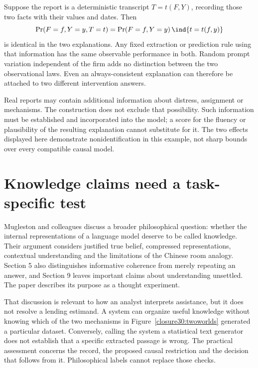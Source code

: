 Suppose the report is a deterministic transcript $T=t(F,Y)$, recording those
two facts with their values and dates. Then
\begin{equation}
 \Pr(F=f,Y=y,T=t)=\Pr(F=f,Y=y)\,\ind\{t=t(f,y)\}
\end{equation}
is identical in the two explanations. Any fixed extraction or prediction rule
using that information has the same observable performance in both. Random
prompt variation independent of the firm adds no distinction between the two
observational laws. Even an always-consistent explanation can therefore be
attached to two different intervention answers.

Real reports may contain additional information about distress, assignment
or mechanisms. The construction does not exclude that possibility. Such
information must be established and incorporated into the model; a score for
the fluency or plausibility of the resulting explanation cannot substitute
for it. The two effects displayed here demonstrate nonidentification in this
example, not sharp bounds over every compatible causal model.

\section{Knowledge claims need a task-specific test}

Mugleston and colleagues discuss a broader philosophical question: whether
the internal representations of a language model deserve to be called
knowledge. Their argument considers justified true belief, compressed
representations, contextual understanding and the limitations of the Chinese
room analogy. Section 5 also distinguishes informative coherence from merely
repeating an answer, and Section 9 leaves important claims about understanding
unsettled. The paper describes its purpose as a thought experiment.
\citep[Sections 3.3--6 and 9]{closure30mugleston}

That discussion is relevant to how an analyst interprets assistance, but it
does not resolve a lending estimand. A system can organize useful knowledge
without knowing which of the two mechanisms in Figure~\ref{closure30:twoworlds}
generated a particular dataset. Conversely, calling the system a statistical
text generator does not establish that a specific extracted passage is wrong.
The practical assessment concerns the record, the proposed causal restriction
and the decision that follows from it. Philosophical labels cannot replace
those checks.

